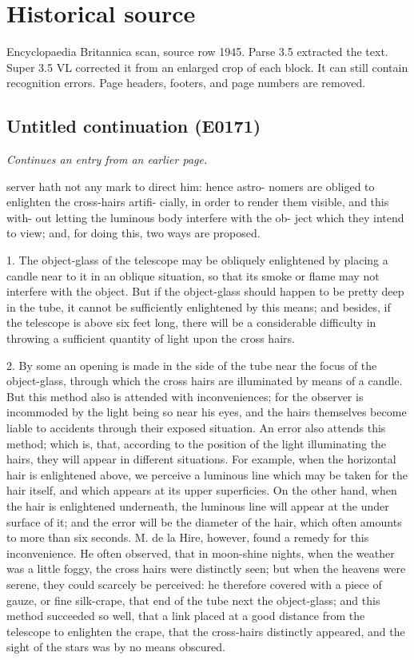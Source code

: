 \documentclass{article}
\begin{document}
\section*{Historical source}
Encyclopaedia Britannica scan, source row 1945. Parse 3.5 extracted the text. Super 3.5 VL corrected it from an enlarged crop of each block. It can still contain recognition errors.
Page headers, footers, and page numbers are removed.

\subsection*{Untitled continuation (E0171)}
\textit{Continues an entry from an earlier page.}

server hath not any mark to direct him: hence astro-
nomers are obliged to enlighten the cross-hairs artifi-
cially, in order to render them visible, and this with-
out letting the luminous body interfere with the ob-
ject which they intend to view; and, for doing this,
two ways are proposed.

1. The object-glass of the telescope may be obliquely enlightened by placing a candle near to it in an oblique situation, so that its smoke or flame may not interfere with the object. But if the object-glass should happen to be pretty deep in the tube, it cannot be sufficiently enlightened by this means; and besides, if the telescope is above six feet long, there will be a considerable difficulty in throwing a sufficient quantity of light upon the cross hairs.

2. By some an opening is made in the side of the tube near the focus of the object-glass, through which the cross hairs are illuminated by means of a candle. But this method also is attended with inconveniences; for the observer is incommoded by the light being so near his eyes, and the hairs themselves become liable to accidents through their exposed situation. An error also attends this method; which is, that, according to the position of the light illuminating the hairs, they will appear in different situations. For example, when the horizontal hair is enlightened above, we perceive a luminous line which may be taken for the hair itself, and which appears at its upper superficies. On the other hand, when the hair is enlightened underneath, the luminous line will appear at the under surface of it; and the error will be the diameter of the hair, which often amounts to more than six seconds. M. de la Hire, however, found a remedy for this inconvenience. He often observed, that in moon-shine nights, when the weather was a little foggy, the cross hairs were distinctly seen; but when the heavens were serene, they could scarcely be perceived: he therefore covered with a piece of gauze, or fine silk-crape, that end of the tube next the object-glass; and this method succeeded so well, that a link placed at a good distance from the telescope to enlighten the crape, that the cross-hairs distinctly appeared, and the sight of the stars was by no means obscured.
\end{document}
